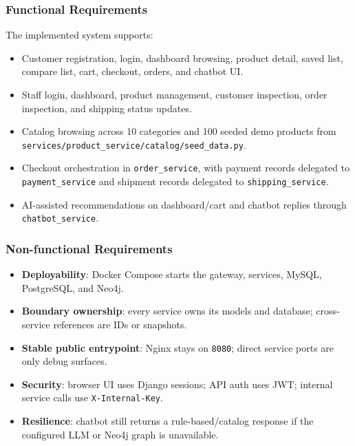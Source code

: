 \documentclass[12pt,a4paper]{article}
\newcommand{\codepath}[1]{{\small\texttt{#1}}}
\begin{document}
\subsubsection{Functional Requirements}

The implemented system supports:

\begin{itemize}
    \item Customer registration, login, dashboard browsing, product detail, saved list, compare list, cart, checkout, orders, and chatbot UI.
    \item Staff login, dashboard, product management, customer inspection, order inspection, and shipping status updates.
    \item Catalog browsing across 10 categories and 100 seeded demo products from \codepath{services/product\_service/catalog/seed\_data.py}.
    \item Checkout orchestration in \codepath{order\_service}, with payment records delegated to \codepath{payment\_service} and shipment records delegated to \codepath{shipping\_service}.
    \item AI-assisted recommendations on dashboard/cart and chatbot replies through \codepath{chatbot\_service}.
\end{itemize}

\subsubsection{Non-functional Requirements}

\begin{itemize}
    \item \textbf{Deployability}: Docker Compose starts the gateway, services, MySQL, PostgreSQL, and Neo4j.
    \item \textbf{Boundary ownership}: every service owns its models and database; cross-service references are IDs or snapshots.
    \item \textbf{Stable public entrypoint}: Nginx stays on \codepath{8080}; direct service ports are only debug surfaces.
    \item \textbf{Security}: browser UI uses Django sessions; API auth uses JWT; internal service calls use \codepath{X-Internal-Key}.
    \item \textbf{Resilience}: chatbot still returns a rule-based/catalog response if the configured LLM or Neo4j graph is unavailable.
\end{itemize}
\end{document}
